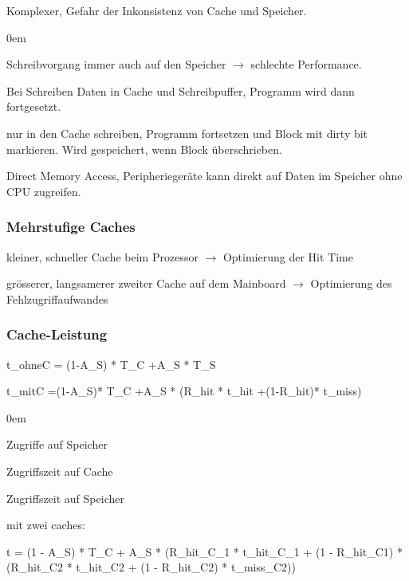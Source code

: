 Komplexer, Gefahr der Inkonsistenz von Cache und Speicher.

\begin{description}\itemsep0em
\item[Write-through] Schreibvorgang immer auch auf den Speicher $\rightarrow$ schlechte Performance.
\item[Write Puffer] Bei Schreiben Daten in Cache und Schreibpuffer, Programm wird dann fortgesetzt. 
\item[Write Back] nur in den Cache schreiben, Programm fortsetzen und Block mit dirty bit markieren. Wird gespeichert, wenn Block überschrieben.
\item[DMA] Direct Memory Access, Peripheriegeräte kann direkt auf Daten im Speicher ohne CPU zugreifen.
\end{description}

\subsubsection{Mehrstufige Caches}

kleiner, schneller Cache beim Prozessor $\rightarrow$ Optimierung der Hit Time

grösserer, langsamerer zweiter Cache auf dem Mainboard $\rightarrow$  Optimierung des Fehlzugriffaufwandes

\subsubsection{Cache-Leistung}

t\_ohneC = (1-A\_S) * T\_C +A\_S * T\_S

t\_mitC =(1-A\_S)* T\_C +A\_S * (R\_hit * t\_hit +(1-R\_hit)* t\_miss)

\begin{description}\itemsep0em
\item[A\_S] Zugriffe auf Speicher
\item[T\_C] Zugriffszeit auf Cache
\item[T\_S] Zugriffszeit auf Speicher
\end{description}

mit zwei caches:

t = (1 - A\_S) * T\_C + A\_S * (R\_hit\_C\_1 * t\_hit\_C\_1 + (1 - R\_hit\_C1) * (R\_hit\_C2 * t\_hit\_C2 + (1 - R\_hit\_C2) * t\_miss\_C2))






